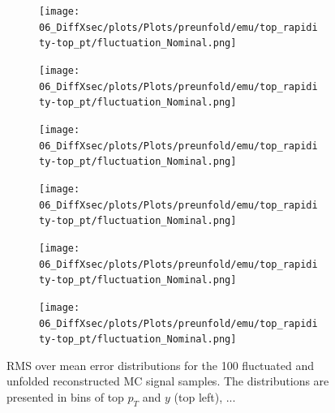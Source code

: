\begin{figure}[h]
\centering
\begin{subfigure}
  \centering
  \texttt{[image: 06\_DiffXsec/plots/Plots/preunfold/emu/top\_rapidity-top\_pt/fluctuation\_Nominal.png]}
\end{subfigure}
\begin{subfigure}
  \centering
  \texttt{[image: 06\_DiffXsec/plots/Plots/preunfold/emu/top\_rapidity-top\_pt/fluctuation\_Nominal.png]}
\end{subfigure}
\begin{subfigure}
  \centering
  \texttt{[image: 06\_DiffXsec/plots/Plots/preunfold/emu/top\_rapidity-top\_pt/fluctuation\_Nominal.png]}
\end{subfigure}
\begin{subfigure}
  \centering
  \texttt{[image: 06\_DiffXsec/plots/Plots/preunfold/emu/top\_rapidity-top\_pt/fluctuation\_Nominal.png]}
\end{subfigure}
\begin{subfigure}
  \centering
  \texttt{[image: 06\_DiffXsec/plots/Plots/preunfold/emu/top\_rapidity-top\_pt/fluctuation\_Nominal.png]}
\end{subfigure}
\begin{subfigure}
  \centering
  \texttt{[image: 06\_DiffXsec/plots/Plots/preunfold/emu/top\_rapidity-top\_pt/fluctuation\_Nominal.png]}
\end{subfigure}
\caption{RMS over mean error distributions for the 100 fluctuated and unfolded reconstructed MC signal samples. The distributions are
         presented in bins of top $p_{T}$ and $y$ (top left), ...}
\label{fig:RMSovMeanErr}
\end{figure}

